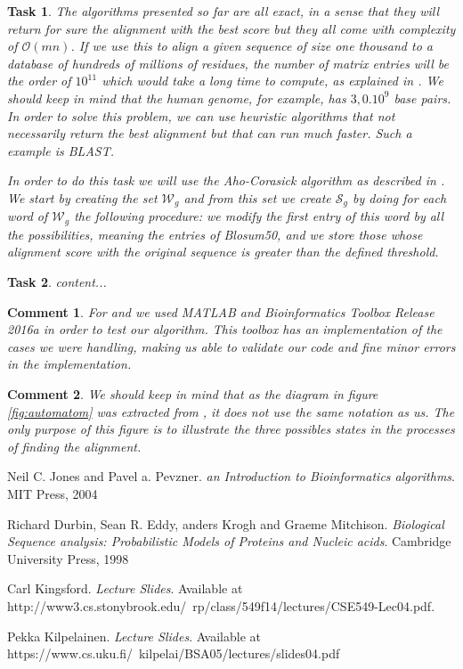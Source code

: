 \documentclass[11pt]{article} %
\theoremstyle{problemstyle}
\newtheorem{exercise}{Task}	%
\theoremstyle{problemstyle}
\newtheorem{commental}{Comment}
\renewcommand*{\O}{\mathcal{O}}
\renewcommand*{\S}{\mathcal{S}}
\newcommand*{\W}{\mathcal{W}}
\begin{document}
\begin{exercise} %
The algorithms presented so far are all exact, in a sense that they will return for sure the alignment with the best score but they all come with complexity of $\O(mn)$. If we use this to align a given sequence of size one thousand to a database of hundreds of millions of residues, the number of matrix entries will be the order of $10^{11}$ which would take a long time to compute, as explained in \cite{durbin}. We should keep in mind that the human genome, for example, has $3,0.10^9$ base pairs. In order to solve this problem, we can use heuristic algorithms that not necessarily return the best alignment but that can run much faster. Such a example is BLAST.

In order to do this task we will use the Aho-Corasick algorithm as described in \cite{pekka}. We start by creating the set $\W_g$ and from this set we create $\S_g$ by doing for each word of $\W_g$ the following procedure: we modify the first entry of this word by all the possibilities, meaning the entries of Blosum50, and we store those whose alignment score with the original sequence is greater than the defined threshold. 
\end{exercise}

\begin{exercise} %
	content...
\end{exercise}

\begin{commental}
For  and  we used MATLAB and Bioinformatics Toolbox Release 2016a in order to test our algorithm. This toolbox has an implementation of the cases we were handling, making us able to validate our code and fine minor errors in the implementation.
\end{commental}

\begin{commental} 
We should keep in mind that as the diagram in figure \ref{fig:automatom} was extracted from \cite{durbin}, it does not use the same notation as us. The only purpose of this figure is to illustrate the three possibles states in the processes of finding the alignment.
\end{commental}

\begin{thebibliography}{3}
	
	Neil C. Jones and Pavel a. Pevzner. 
	\textit{an Introduction to Bioinformatics algorithms}. 
	MIT Press, 2004
	
	Richard Durbin, Sean R. Eddy, anders Krogh and Graeme Mitchison. 
	\textit{Biological Sequence analysis: Probabilistic Models of Proteins and Nucleic acids}. 
	Cambridge University Press, 1998
	
	 Carl Kingsford. 
	\textit{Lecture Slides}. 
	 Available at \\ http://www3.cs.stonybrook.edu/~rp/class/549f14/lectures/CSE549-Lec04.pdf.
	
	Pekka Kilpelainen. 
	\textit{Lecture Slides}. 
	Available at\\ https://www.cs.uku.fi/~kilpelai/BSA05/lectures/slides04.pdf
\end{thebibliography}
\end{document}
